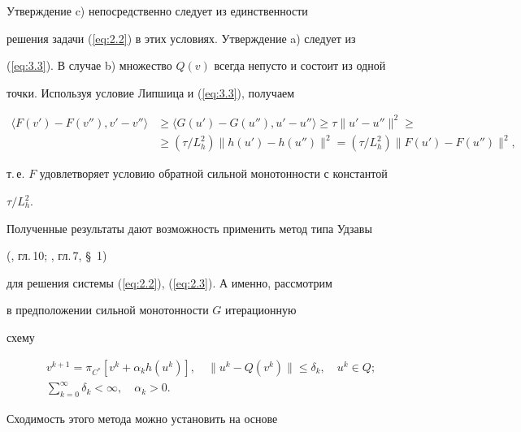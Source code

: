 \begin{pf}


Утверждение c) непосредственно следует из единственности 


решения задачи (\ref{eq:2.2}) в этих условиях. Утверждение a) следует из 


(\ref{eq:3.3}). В случае b) множество $Q(v)$ всегда непусто и состоит из одной 


точки. Используя условие Липшица и (\ref{eq:3.3}), получаем


\begin{align*}


\langle F(v') - F(v''), v' - v'' \rangle 


& \geq \langle G(u')-G(u''), u'-u''\rangle \geq \tau \| u' - u'' \|^2\ge \\


&\geq (\tau/L^2_h)\|h(u')-h(u'')\|^2=(\tau/L^2_h) \| F(u') - F(u'') \|^2, 


\end{align*} 


т.\,е. $F$ удовлетворяет условию обратной сильной монотонности с константой 


$\tau / L^2_{h}$.


\end{pf}





Полученные результаты дают возможность применить метод типа Удзавы 


(\cite{EGU62}, гл.\,10; \cite{ET79}, гл.\,7, \S\, 1)


для решения системы (\ref{eq:2.2}), (\ref{eq:2.3}). А именно, рассмотрим 


в предположении сильной монотонности $G$ итерационную 


схему


\begin{gather}


v^{k+1} = \pi_{C^*} [v^{k}+\alpha_{k}h(u^{k})] ,\quad


\|u^{k} - Q(v^{k}) \| \leq \delta_{k}, \quad


u^{k} \in Q; \label{eq:3.4} \\


\sum_{k=0}^{\infty} \delta_{k} < \infty ,\quad \alpha_k>0. \label{eq:3.5} 


\end{gather}


Сходимость этого метода можно установить на основе 


